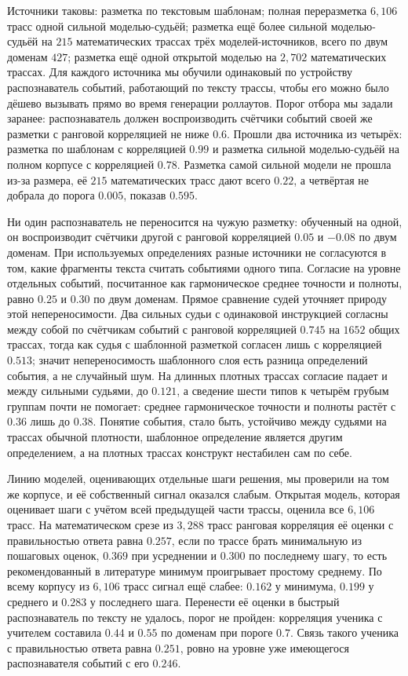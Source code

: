 \documentclass[11pt]{article}
\begin{document}
Источники таковы: разметка по текстовым шаблонам; полная переразметка $6{,}106$ трасс одной сильной моделью-судьёй; разметка ещё более сильной моделью-судьёй на $215$ математических трассах трёх моделей-источников, всего по двум доменам $427$; разметка ещё одной открытой моделью на $2{,}702$ математических трассах. Для каждого источника мы обучили одинаковый по устройству распознаватель событий, работающий по тексту трассы, чтобы его можно было дёшево вызывать прямо во время генерации роллаутов. Порог отбора мы задали заранее: распознаватель должен воспроизводить счётчики событий своей же разметки с ранговой корреляцией не ниже $0.6$. Прошли два источника из четырёх: разметка по шаблонам с корреляцией $0.99$ и разметка сильной моделью-судьёй на полном корпусе с корреляцией $0.78$. Разметка самой сильной модели не прошла из-за размера, её $215$ математических трасс дают всего $0.22$, а четвёртая не добрала до порога $0.005$, показав $0.595$.

Ни один распознаватель не переносится на чужую разметку: обученный на одной, он воспроизводит счётчики другой с ранговой корреляцией $0.05$ и $-0.08$ по двум доменам. При используемых определениях разные источники не согласуются в том, какие фрагменты текста считать событиями одного типа. Согласие на уровне отдельных событий, посчитанное как гармоническое среднее точности и полноты, равно $0.25$ и $0.30$ по двум доменам. Прямое сравнение судей уточняет природу этой непереносимости. Два сильных судьи с одинаковой инструкцией согласны между собой по счётчикам событий с ранговой корреляцией $0.745$ на $1652$ общих трассах, тогда как судья с шаблонной разметкой согласен лишь с корреляцией $0.513$; значит непереносимость шаблонного слоя есть разница определений события, а не случайный шум. На длинных плотных трассах согласие падает и между сильными судьями, до $0.121$, а сведение шести типов к четырём грубым группам почти не помогает: среднее гармоническое точности и полноты растёт с $0.36$ лишь до $0.38$. Понятие события, стало быть, устойчиво между судьями на трассах обычной плотности, шаблонное определение является другим определением, а на плотных трассах конструкт нестабилен сам по себе.

Линию моделей, оценивающих отдельные шаги решения, мы проверили на том же корпусе, и её собственный сигнал оказался слабым. Открытая модель, которая оценивает шаги с учётом всей предыдущей части трассы, оценила все $6{,}106$ трасс. На математическом срезе из $3{,}288$ трасс ранговая корреляция её оценки с правильностью ответа равна $0.257$, если по трассе брать минимальную из пошаговых оценок, $0.369$ при усреднении и $0.300$ по последнему шагу, то есть рекомендованный в литературе минимум проигрывает простому среднему. По всему корпусу из $6{,}106$ трасс сигнал ещё слабее: $0.162$ у минимума, $0.199$ у среднего и $0.283$ у последнего шага. Перенести её оценки в быстрый распознаватель по тексту не удалось, порог не пройден: корреляция ученика с учителем составила $0.44$ и $0.55$ по доменам при пороге $0.7$. Связь такого ученика с правильностью ответа равна $0.251$, ровно на уровне уже имеющегося распознавателя событий с его $0.246$.
\end{document}
